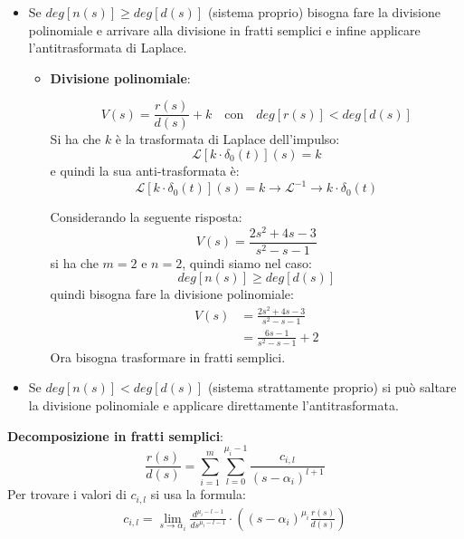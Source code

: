 \documentclass[a4paper]{article}
\begin{document}
\begin{itemize}
  \item Se \( deg\left[ n(s) \right] \ge deg\left[ d(s) \right] \) (sistema proprio)
    bisogna fare la divisione polinomiale e arrivare alla divisione in fratti semplici
    e infine applicare l'antitrasformata di Laplace.
    \begin{itemize}
      \item \textbf{Divisione polinomiale}:

        \vspace{1em}
        \noindent
        \[
          V(s) = \frac{r(s)}{d(s)} + k \quad \text{con} \quad deg\left[ r(s) \right] < deg\left[ d(s) \right]
        \] 
        Si ha che \( k \) è la trasformata di Laplace dell'impulso:
        \[
          \mathcal{L}\left[ k \cdot \delta_0(t) \right](s) = k
        \] 
        e quindi la sua anti-trasformata è:
        \[
          \mathcal{L}\left[ k \cdot \delta_0(t) \right](s) = k \to \mathcal{L}^{-1}
          \to k \cdot \delta_0(t)
        \] 

        \begin{example}
          Considerando la seguente risposta:
          \[
            V(s) = \frac{2s^2 + 4s - 3}{s^2 -s -1}
          \] 
          si ha che \( m = 2 \) e \( n = 2 \), quindi siamo nel caso:
          \[
            deg\left[ n(s) \right] \ge  deg\left[ d(s) \right]
          \] 
          quindi bisogna fare la divisione polinomiale:
          \[
            \begin{aligned}
              V(s) &= \frac{2s^2 + 4s - 3}{s^2 -s -1}\\
                   &= \frac{6s-1}{s^2-s-1} + 2
            \end{aligned}
          \]
          Ora bisogna trasformare in fratti semplici.
        \end{example}
    \end{itemize}

  \item Se \( deg\left[ n(s) \right] < deg\left[ d(s) \right] \) (sistema strattamente proprio)
    si può saltare la divisione polinomiale e applicare direttamente l'antitrasformata.
\end{itemize}

\noindent
\textbf{Decomposizione in fratti semplici}:
\[
  \frac{r(s)}{d(s)} = \sum_{i=1}^{m} \sum_{l=0}^{\mu_i-1} \frac{c_{i,l}}{(s-\alpha_i)^{l+1}}
\] 
Per trovare i valori di \( c_{i,l} \) si usa la formula:
\[
\begin{aligned}
  c_{i,l} = \lim_{s \to \alpha_i} \frac{d^{\mu_i-l-1}}
  {d  s^{\mu_i-l-1}} \cdot 
\left( \left( s-\alpha_i \right)^{\mu_i} \frac{r(s)}{d(s)} \right)
\end{aligned}
\] 
\end{document}
